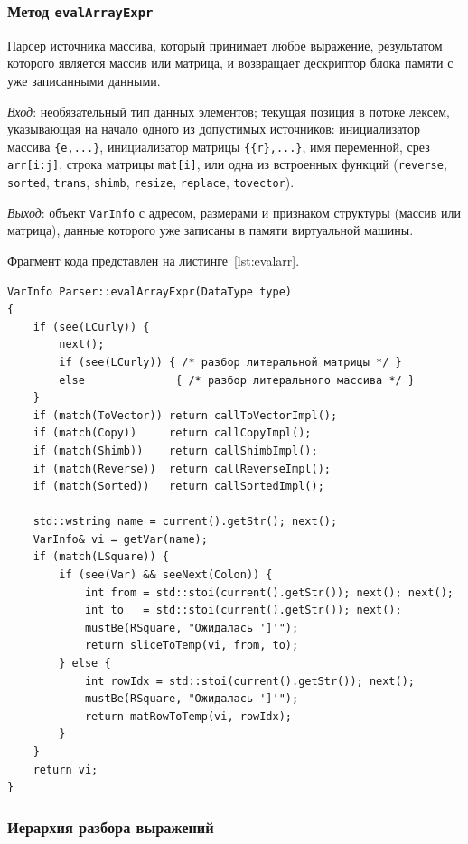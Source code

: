 \documentclass[a4paper,final]{article}
\begin{document}
\subsubsection*{Метод \texttt{evalArrayExpr}}

Парсер источника массива, который принимает любое выражение,
результатом которого является массив или матрица, и возвращает дескриптор
блока памяти с уже записанными данными.

\textit{Вход}: необязательный тип данных элементов; текущая позиция в
потоке лексем, указывающая на начало одного из допустимых источников:
инициализатор массива \texttt{\{e,...\}}, инициализатор матрицы \texttt{\{\{r\},...\}},
имя переменной, срез \texttt{arr[i:j]}, строка матрицы \texttt{mat[i]},
или одна из встроенных функций (\texttt{reverse},
\texttt{sorted}, \texttt{trans}, \texttt{shimb}, \texttt{resize},
\texttt{replace}, \texttt{tovector}).

\textit{Выход}: объект \texttt{VarInfo} с адресом, размерами и признаком
структуры (массив или матрица), данные которого уже записаны в памяти
виртуальной машины.

Фрагмент кода представлен на листинге~\ref{lst:evalarr}.

\begin{lstlisting}[caption={Метод Parser::evalArrayExpr (фрагмент)}, label=lst:evalarr]
VarInfo Parser::evalArrayExpr(DataType type)
{
    if (see(LCurly)) {
        next();
        if (see(LCurly)) { /* разбор литеральной матрицы */ }
        else              { /* разбор литерального массива */ }
    }
    if (match(ToVector)) return callToVectorImpl();
    if (match(Copy))     return callCopyImpl();
    if (match(Shimb))    return callShimbImpl();
    if (match(Reverse))  return callReverseImpl();
    if (match(Sorted))   return callSortedImpl();

    std::wstring name = current().getStr(); next();
    VarInfo& vi = getVar(name);
    if (match(LSquare)) {
        if (see(Var) && seeNext(Colon)) {
            int from = std::stoi(current().getStr()); next(); next();
            int to   = std::stoi(current().getStr()); next();
            mustBe(RSquare, "Ожидалась ']'");
            return sliceToTemp(vi, from, to);
        } else {
            int rowIdx = std::stoi(current().getStr()); next();
            mustBe(RSquare, "Ожидалась ']'");
            return matRowToTemp(vi, rowIdx);
        }
    }
    return vi;
}
\end{lstlisting}

\subsubsection*{Иерархия разбора выражений}
\end{document}
